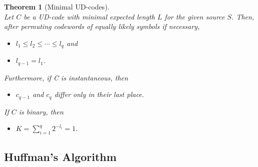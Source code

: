 \documentclass{article}
\newtheorem{theorem}{Theorem}[section]
\begin{document}
\begin{theorem}[Minimal UD-codes]
	\mbox{}\\
	Let $C$ be a UD-code with minimal expected length $L$ for the given source $S$. Then, after permuting codewords of equally likely symbols if necessary,
	\begin{itemize}
		\item $l_{1} \leq l_{2} \leq \cdots \leq l_{q}$ and
		\item $l_{q-1}=l_{1}$.
	\end{itemize}
	Furthermore, if C is instantaneous, then
	\begin{itemize}
		\item $c_{q-1}$ and $c_{q}$ differ only in their last place.
	\end{itemize}
	If $C$ is binary, then
	\begin{itemize}
		\item $K=\sum_{i=1}^{q}2^{-l_{i}}=1.$
	\end{itemize}
\end{theorem}

\subsection{Huffman's Algorithm}
\end{document}
